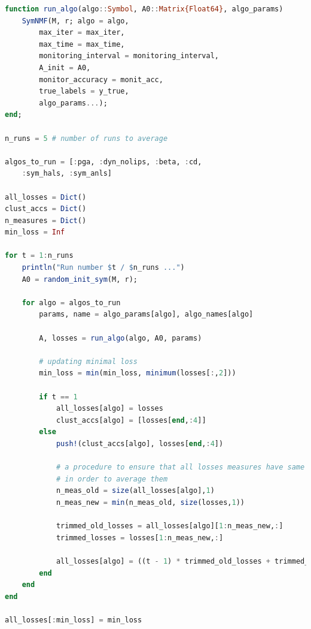 \documentclass[a4paper,11pt]{article}
\begin{document}
\begin{lstlisting}[language=Julia, caption={Запуск алгоритмов}, label={lst:example3}]
function run_algo(algo::Symbol, A0::Matrix{Float64}, algo_params)
    SymNMF(M, r; algo = algo, 
        max_iter = max_iter, 
        max_time = max_time,
        monitoring_interval = monitoring_interval, 
        A_init = A0, 
        monitor_accuracy = monit_acc, 
        true_labels = y_true,
        algo_params...);
end;

n_runs = 5 # number of runs to average

algos_to_run = [:pga, :dyn_nolips, :beta, :cd,
    :sym_hals, :sym_anls]

all_losses = Dict()
clust_accs = Dict()
n_measures = Dict()
min_loss = Inf

for t = 1:n_runs
    println("Run number $t / $n_runs ...")
    A0 = random_init_sym(M, r);

    for algo = algos_to_run
        params, name = algo_params[algo], algo_names[algo]

        A, losses = run_algo(algo, A0, params)

        # updating minimal loss
        min_loss = min(min_loss, minimum(losses[:,2]))

        if t == 1
            all_losses[algo] = losses
            clust_accs[algo] = [losses[end,:4]]
        else
            push!(clust_accs[algo], losses[end,:4])

            # a procedure to ensure that all losses measures have same size,
            # in order to average them
            n_meas_old = size(all_losses[algo],1)
            n_meas_new = min(n_meas_old, size(losses,1))

            trimmed_old_losses = all_losses[algo][1:n_meas_new,:]
            trimmed_losses = losses[1:n_meas_new,:]

            all_losses[algo] = ((t - 1) * trimmed_old_losses + trimmed_losses) / t
        end
    end
end

all_losses[:min_loss] = min_loss
\end{lstlisting}
\end{document}
